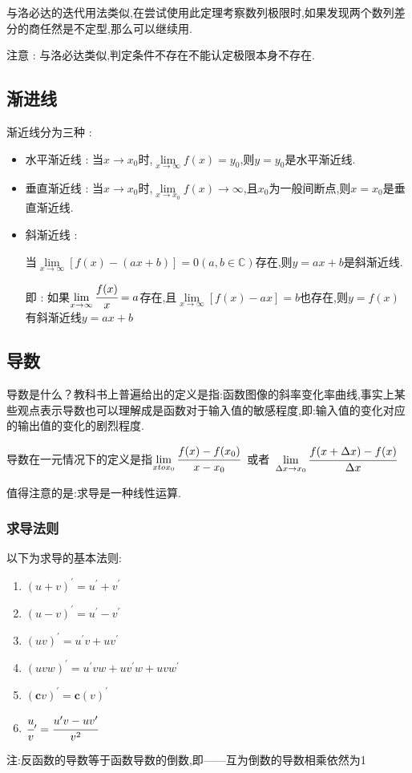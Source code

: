 \documentclass[UTF8,12pt]{ctexbook}
\newcommand{\limNormal}[1]{\lim\limits_{#1}}
\newcommand{\myLimToInf}{\limNormal{x \to \infty}}
\newcommand{\derivative}{^\prime}
\newcommand{\defFunction}[1]{f(#1)}
\newcommand{\mathConstant}{\mathbb{C}}
\begin{document}
{{{{    与洛必达的迭代用法类似,在尝试使用此定理考察数列极限时,如果发现两个数列差分的商任然是不定型,那么可以继续用.

    注意 : 与洛必达类似,判定条件不存在不能认定极限本身不存在.
  }%

}%

\subsection{渐进线}{
  渐近线分为三种 :
  \begin{itemize}
    \item 水平渐近线 : 当$x \to x_0$时,$\myLimToInf\defFunction{x} = y_0$,则$y = y_0$是水平渐近线.
    \item 垂直渐近线 : 当$x \to x_0$时,$\limNormal{x \to x_0}\defFunction{x} \to \infty$,且$x_0$为一般间断点,则$x = x_0$是垂直渐近线.
    \item {
          斜渐近线 :

          当$\myLimToInf\left[\defFunction{x} - (ax + b)\right] = 0(a,b \in \mathConstant)$存在,则$y = ax + b$是斜渐近线.

          即 : 如果$\myLimToInf\cfrac{\defFunction{x}}{x} = a$存在,且$\myLimToInf\left[\defFunction{x} - ax\right] = b$也存在,则$y = \defFunction{x}$有斜渐近线$y = ax + b$
          }
  \end{itemize}
}%

\subsection{导数}{
  导数是什么？教科书上普遍给出的定义是指:函数图像的斜率变化率曲线,事实上某些观点表示导数也可以理解成是函数对于输入值的敏感程度,即:输入值的变化对应的输出值的变化的剧烈程度.

  导数在一元情况下的定义是指$\limNormal{x to x_0}\cfrac{f(x) - f(x_0)}{x - x_0}$\ 或者\ $\limNormal{\Delta x \to x_0}\cfrac{f(x + \Delta x) - f(x)}{\Delta x}$

  值得注意的是:求导是一种线性运算.

  \subsubsection{求导法则}{
    以下为求导的基本法则:
    \begin{enumerate}
      \item $(u + v)\derivative = u\derivative + v\derivative$
      \item $(u - v)\derivative = u\derivative - v\derivative$
      \item $(uv)\derivative = u\derivative v + uv\derivative$
      \item $(uvw)\derivative = u\derivative vw + uv\derivative w + uvw\derivative$
      \item $(\mathbf{c}v)\derivative = \mathbf{c}(v)\derivative$
      \item $\cfrac{u}{v}\derivative = \cfrac{u\derivative v - uv\derivative}{v^2}$
    \end{enumerate}
    注:反函数的导数等于函数导数的倒数,即——互为倒数的导数相乘依然为1
  }%

}}}
\end{document}
